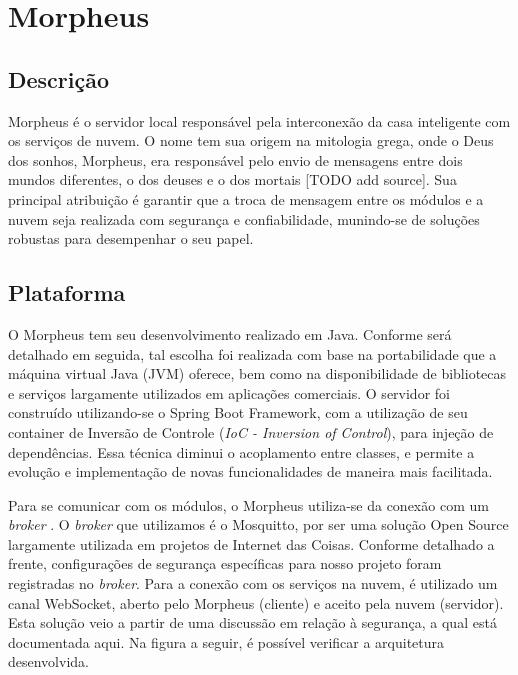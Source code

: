 \section{Morpheus}

\subsection{Descrição}
Morpheus é o servidor local responsável pela interconexão da casa inteligente com os serviços de nuvem. O nome tem sua origem na mitologia grega, onde o Deus dos sonhos, Morpheus, era responsável pelo envio de mensagens entre dois mundos diferentes, o dos deuses e o dos mortais [TODO add source]. Sua principal atribuição é garantir que a troca de mensagem entre os módulos e a nuvem seja realizada com segurança e confiabilidade, munindo-se de soluções robustas para desempenhar o seu papel.

\subsection{Plataforma}
O Morpheus tem seu desenvolvimento realizado em Java. Conforme será detalhado em seguida, tal escolha foi realizada com base na portabilidade que a máquina virtual Java (JVM) oferece, bem como na disponibilidade de bibliotecas e serviços largamente utilizados em aplicações comerciais. O servidor foi construído utilizando-se o Spring Boot Framework, com a utilização de seu container de Inversão de Controle (\textit{IoC - Inversion of Control}), para injeção de dependências. Essa técnica diminui o acoplamento entre classes, e permite a evolução e implementação de novas funcionalidades de maneira mais facilitada.

Para se comunicar com os módulos, o Morpheus utiliza-se da conexão com um \textit{broker} \wmqtt{}. O \textit{broker} que utilizamos é o Mosquitto, por ser uma solução Open Source largamente utilizada em projetos de Internet das Coisas. Conforme detalhado a frente, configurações de segurança específicas para nosso projeto foram registradas no \textit{broker}. Para a conexão com os serviços na nuvem, é utilizado um canal WebSocket, aberto pelo Morpheus (cliente) e aceito pela nuvem (servidor). Esta solução veio a partir de uma discussão em relação à segurança, a qual está documentada aqui. Na figura a seguir, é possível verificar a arquitetura desenvolvida.


